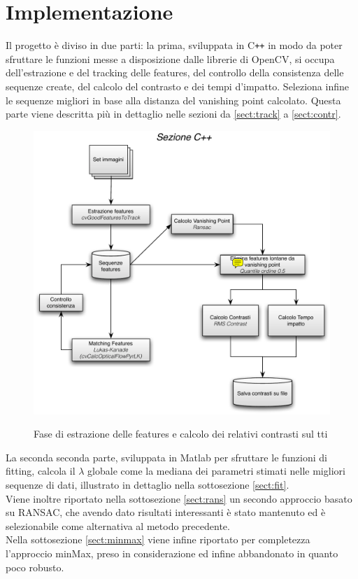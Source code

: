 \documentclass[12pt]{report}
\begin{document}
\chapter{Implementazione}

\noindent Il progetto \`e diviso in due parti: la prima, sviluppata in C\verb|++| in modo da poter sfruttare le funzioni messe a disposizione dalle librerie di OpenCV, si occupa dell'estrazione e del tracking delle features, del controllo della consistenza delle sequenze create, del calcolo del contrasto e dei tempi d'impatto. Seleziona infine le sequenze migliori in base alla distanza del vanishing point calcolato. Questa parte viene descritta pi\`u in dettaglio nelle sezioni da \ref{sect:track} a \ref{sect:contr}.\\

\begin{figure}[H]
	\centering
	\includegraphics[scale=0.7]{images/schemaCpp.pdf} 
	\label{diag:high}
	\caption{Fase di estrazione delle features e calcolo dei relativi contrasti sul tti}
\end{figure}

\noindent La seconda seconda parte, sviluppata in Matlab per sfruttare le funzioni di fitting, calcola il $\lambda$ globale come la mediana dei parametri stimati nelle migliori sequenze di dati, illustrato in dettaglio nella sottosezione \ref{sect:fit}.\\
Viene inoltre riportato nella sottosezione \ref{sect:rans} un secondo approccio basato su RANSAC, che avendo dato risultati interessanti \`e stato mantenuto ed \`e selezionabile come alternativa al metodo precedente.\\
Nella sottosezione \ref{sect:minmax} viene infine riportato per completezza l'approccio minMax, preso in considerazione ed infine abbandonato in quanto poco robusto.\\
\end{document}

